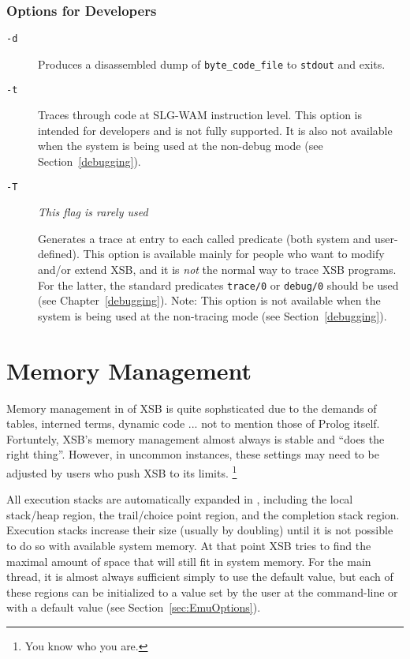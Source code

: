 \subsubsection{Options for Developers}
\begin{description}
\item[{\tt -d}] Produces a disassembled dump of {\tt byte\_code\_file} to 
    {\tt stdout} and exits.
  \item[{\tt -t}] Traces through code at SLG-WAM instruction level.
  This option is intended for developers and is not fully supported.
  It is also not available when the system is being used at the
  non-debug mode (see Section~\ref{debugging}).
\item[{\tt -T}]
    {\em This flag is rarely used}

    Generates a trace at entry to each called predicate
    (both system and user-defined).  This option is available mainly
    for people who want to modify and/or extend XSB, and it is
    {\em not\/} the normal way to trace XSB programs.  For the
    latter, the standard predicates {\tt trace/0} or {\tt debug/0}
    should be used (see Chapter~\ref{debugging}).
    Note: This option is not available when the system is being used
    at the non-tracing mode (see Section~\ref{debugging}).

\end{description}

\section{Memory Management}\label{memory_management}
 

Memory management in \version{} of XSB is quite sophsticated due to
the demands of tables, interned terms, dynamic code ... not to mention
those of Prolog itself.  Fortuntely, XSB's memory management almost
always is stable and ``does the right thing''.  However, in uncommon
instances, these settings may need to be adjusted by users who push
XSB to its limits. \footnote{You know who you are.}

All execution stacks are automatically expanded in \version{},
including the local stack/heap region, the trail/choice point region,
and the completion stack region.  Execution stacks increase their size
(usually by doubling) until it is not possible to do so with available
system memory.  At that point XSB tries to find the maximal amount of
space that will still fit in system memory.  For the main thread, it
is almost always sufficient simply to use the default value, but each
of these regions can be initialized to a value set by the user at the
command-line or with a default value (see Section~\ref{sec:EmuOptions}). 

